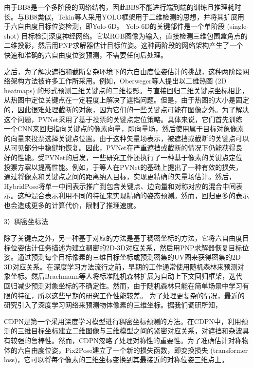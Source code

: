 \documentclass[12pt]{article}
\begin{document}
由于BB8是一个多阶段的网络结构，因此BB8不能进行端到端的训练且推理耗时长。与BB8类似，Tekin等人\cite{tekin2018realTime}采用YOLO\cite{redmon2016yolo}框架用于二维检测的思想，并将其扩展用于六自由度目标位姿检测，即Yolo-6D。 Yolo-6D的关键部件是一个单阶段 (single-shot) 目标检测深度神经网络。它以RGB图像为输入，直接检测三维包围盒角点的二维投影，然后用PNP求解器估计目标位姿。这种两阶段的网络架构产生了一个快速和准确的六自由度位姿预测，不需要任何后处理。

之后，为了解决遮挡和截断复杂环境下的六自由度位姿估计的挑战，这种两阶段网络架构方法被许多工作\cite{pavlakos2017,zhao2018estimating,oberweger2018,hu2019segDriven}所采用。例如，Oberweger等人\cite{oberweger2018}提出以二维热图 (2D heatmaps) 的形式预测三维关键点的二维投影。与直接回归二维关键点坐标相比，从热图中定位关键点在一定程度上解决了遮挡问题。但是，由于热图的大小是固定的，因此很难处理截断的对象，因为它们的一些关键点可能在图像之外。为了解决这个问题，PVNet\cite{peng2019pvnet}采用了基于投票的关键点定位策略。具体来说，它们首先训练一个CNN来回归指向关键点的像素向量，即向量场，然后使用属于目标对象像素的向量来投票选择关键点位置。由于这种矢量场表示，被遮挡或截断的关键点可以从可见部分中稳健地恢复。因此，PVNet在严重遮挡或截断的情况下仍能获得良好的性能。受PVNet的启发，一些研究工作还执行了一种基于像素的关键点定位投票方案以提高性能。例如，于等人\cite{yu20206dof}在PVNet的基础上提出了一种有效的损失，通过将像素和关键点之间的距离纳入目标，实现更精确的矢量场估计。然后，HybridPose\cite{song2020hybridpose}将单一中间表示推广到包含关键点、边向量和对称对应的混合中间表示。这种混合表示利用不同的特征来实现精确的姿态预测。然而，回归更多的表示也会造成更多的计算代价，限制了推理速度。

3）稠密坐标法

除了关键点之外，另一种基于对应的方法是基于稠密坐标的方法，它将六自由度目标位姿估计任务描述为建立稠密的2D-3D对应关系，然后用PNP求解器恢复目标位姿。通过预测每个目标像素的三维目标坐标或预测密集的UV图来获得密集的2D-3D对应关系。在深度学习方法流行之前，早期的工作通常使用随机森林来预测对象坐标\cite{brachmann2014,krull2015,nigam2018}。然后Brachmann等人\cite{brachmann2016uncertainty}将标准随机森林扩展为自动上下文回归框架，迭代回归减少预测对象坐标的不确定性。然而，由于随机森林只能在简单场景中学习有限的特征，所以这些早期的研究工作性能较差。 为了处理更复杂的情况，最近的研究引入了深度学习网络来预测物体像素的三维坐标。据我们调研所知，


CDPN\cite{li2019cdpn}是第一个采用深度学习模型进行稠密坐标预测的方法。在CDPN中，利用预测的三维目标坐标建立二维图像与三维模型之间的紧密对应关系，对遮挡和杂波具有较强的鲁棒性。然而，CDPN忽略了处理对称性的重要性。为了准确估计对称物体的六自由度位姿，Pix2Pose\cite{park2019pix2pose}建立了一个新的损失函数，即变换损失 (transformer loss)，它可以将每个像素的三维坐标变换到其最接近的对称位姿三维点上。
\end{document}
